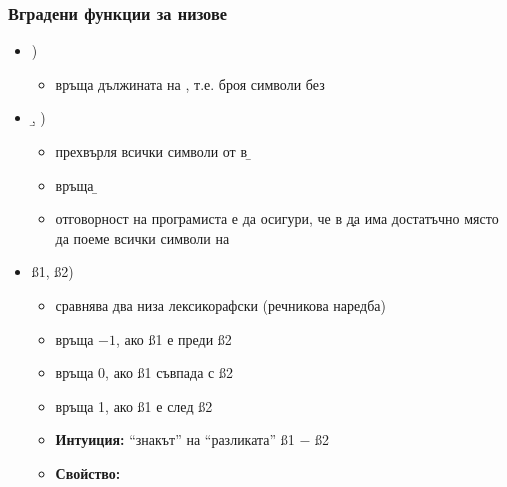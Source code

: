 \documentclass{beamer}
\begin{document}
\begin{frame}
  \frametitle{Вградени функции за низове}


  \begin{itemize}[<+->]
  \item {}\s\tta)
    \begin{itemize}
    \item връща дължината на \s, т.е. броя символи без \term
    \end{itemize}
  \item {}\b, \s\tta)
    \begin{itemize}
    \item прехвърля всички символи от \s в \b
    \item връща \b
    \item \alert{отговорност на програмиста е да осигури, че в \b да има достатъчно място да поеме всички символи на \s}
    \end{itemize}
  \item {}\ss1, \ss2\tta)
    \begin{itemize}
    \item сравнява два низа \alert{лексикорафски} (речникова наредба)
    \item връща $-1$, ако \ss1 е преди \ss2
    \item връща 0, ако \ss1 съвпада с \ss2
    \item връща 1, ако \ss1 е след \ss2
    \item \textbf{Интуиция:} ``знакът'' на ``разликата'' \ss1 $-$ \ss2
    \item \textbf{Свойство:} 
    \end{itemize}
  \end{itemize}
\end{frame}
\end{document}
